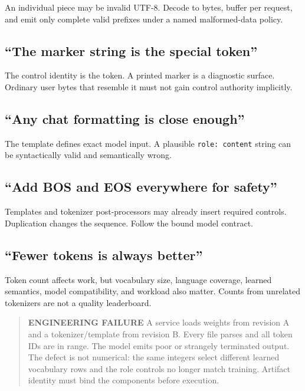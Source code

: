 An individual piece may be invalid UTF-8. Decode to bytes, buffer per
request, and emit only complete valid prefixes under a named
malformed-data policy.

\subsection{``The marker string is the special
token''}\label{the-marker-string-is-the-special-token}

The control identity is the token. A printed marker is a diagnostic
surface. Ordinary user bytes that resemble it must not gain control
authority implicitly.

\subsection{``Any chat formatting is close
enough''}\label{any-chat-formatting-is-close-enough}

The template defines exact model input. A plausible
\texttt{role:\ content} string can be syntactically valid and
semantically wrong.

\subsection{``Add BOS and EOS everywhere for
safety''}\label{add-bos-and-eos-everywhere-for-safety}

Templates and tokenizer post-processors may already insert required
controls. Duplication changes the sequence. Follow the bound model
contract.

\subsection{``Fewer tokens is always
better''}\label{fewer-tokens-is-always-better}

Token count affects work, but vocabulary size, language coverage,
learned semantics, model compatibility, and workload also matter. Counts
from unrelated tokenizers are not a quality leaderboard.

\begin{quote}
\textbf{ENGINEERING FAILURE} A service loads weights from revision A and
a tokenizer/template from revision B. Every file parses and all token
IDs are in range. The model emits poor or strangely terminated output.
The defect is not numerical: the same integers select different learned
vocabulary rows and the role controls no longer match training. Artifact
identity must bind the components before execution.
\end{quote}

